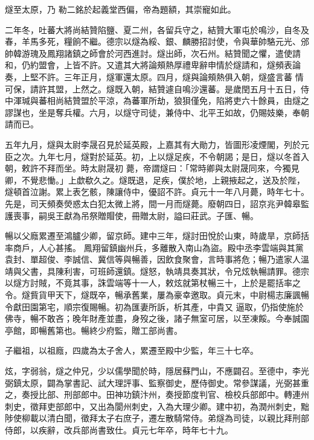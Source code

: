 \begin{pinyinscope}
 燧至太原，乃
 勒二銘於起義堂西偏，帝為題額，其崇寵如此。



 二年冬，吐蕃大將尚結贊陷鹽、夏二州，各留兵守之，結贊大軍屯於鳴沙，自冬及春，羊馬多死，糧餉不繼。德宗以燧為綏、銀、麟勝招討使，令與華帥駱元光、邠帥韓游瑰及鳳翔諸鎮之師會於河西進討。燧出師，次石州。結贊聞之懼，遣使請和，仍約盟會，上皆不許。又遣其大將論頰熱厚禮卑辭申情於燧請和，燧頻表論奏，上堅不許。三年正月，燧軍還太原。四月，燧與論頰熱俱入朝，燧盛言蕃
 情可保，請許其盟，上然之。燧既入朝，結贊遽自鳴沙還蕃。是歲閏五月十五日，侍中渾瑊與蕃相尚結贊盟於平涼，為蕃軍所劫，狼狽僅免，陷將吏六十餘員，由燧之謬謀也，坐是奪兵權。六月，以燧守司徒，兼侍中、北平王如故，仍賜妓樂，奉朝請而已。



 五年九月，燧與太尉李晟召見於延英殿，上嘉其有大勛力，皆圖形凌煙閣，列於元臣之次。九年七月，燧對於延英。初，上以燧足疾，不令朝謁；是日，燧以冬首入朝，敕許不拜而坐。時太尉晟初
 薨，帝謂燧曰：「常時卿與太尉晟同來，今獨見卿，不覺悲慟。」上歔欷久之。燧既退，足疾，僕於地，上親掖起之，送及於陛，燧頓首泣謝。累上表乞骸，陳讓侍中，優詔不許。貞元十一年八月薨，時年七十。先是，司天頻奏熒惑太白犯太微上將，間一月而燧薨。廢朝四日，詔京兆尹韓皋監護喪事，嗣吳王獻為吊祭贈賵使，冊贈太尉，謚曰莊武。子匯、暢。



 暢以父廕累遷至鴻臚少卿，留京師。建中三年，燧討田悅於山東，時歲旱，京師括率商戶，人心甚搖。
 鳳翔留鎮幽州兵，多離散入南山為盜。殿中丞李雲端與其黨袁封、單超俊、李誠信、冀信等與暢善，因飲食聚會，言時事將危；暢乃遣家人溫靖與父書，具陳利害，可班師還鎮。燧怒，執靖具奏其狀，令兄炫執暢請罪。德宗以燧方討賊，不竟其事，誅雲端等十一人，敕炫就第杖暢三十，上於是罷括率之令。燧貲貨甲天下，燧既卒，暢承舊業，屢為豪幸邀取。貞元末，中尉楊志廉諷暢令獻田園第宅，順宗復賜暢。初為匯妻所訴，析其產，中貴又
 逼取，仍指使施於佛寺，暢不敢吝；晚年財產並盡，身歿之後，諸子無室可居，以至凍餒。今奉誠園亭館，即暢舊第也。暢終少府監，贈工部尚書。



 子繼祖，以祖廕，四歲為太子舍人，累遷至殿中少監，年三十七卒。



 炫，字弱翁，燧之仲兄，少以儒學聞於時，隱居蘇門山，不應闢召。至德中，李光弼鎮太原，闢為掌書記、試大理評事、監察御史，歷侍御史。常參謀議，光弼甚重之，奏授比部、刑部郎中。田神功鎮汴州，奏授節度判官、檢校兵部郎中。轉連州
 刺史，徵拜吏部郎中，又出為閬州刺史，入為大理少卿。建中初，為潤州刺史，黜陟使柳載以清白聞，徵拜太子右庶子，遷左散騎常侍。弟燧為司徒，以親比拜刑部侍郎，以疾辭，改兵部尚書致仕。貞元七年卒，時年七十九。




\end{pinyinscope}
